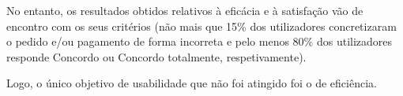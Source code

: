 \documentclass{article}
\begin{document}
No entanto, os resultados obtidos relativos à eficácia e à satisfação vão de encontro com os seus critérios (não mais que 15\% dos utilizadores concretizaram o pedido e/ou pagamento de forma incorreta e pelo menos 80\% dos utilizadores responde Concordo ou Concordo totalmente, respetivamente).

Logo, o único objetivo de usabilidade que não foi atingido foi o de eficiência.
\end{document}
